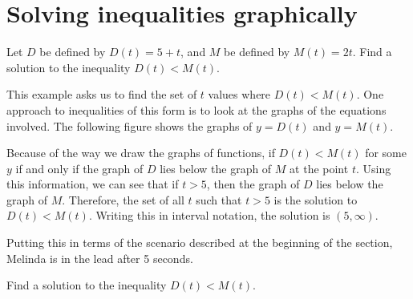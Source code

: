 \documentclass[noauthor, nooutcomes]{ximera}
\begin{document}
\section{Solving inequalities graphically}
\begin{example}
Let $D$ be defined by $D(t) = 5 + t$, and $M$ be defined by $M(t) = 2t$. Find a solution to the inequality $D(t) < M(t)$. 
\end{example}
\begin{explanation}
This example asks us to find the set of $t$ values where $D(t) < M(t)$. One approach to inequalities of this form is to look at the graphs of the equations involved. The following figure shows the graphs of $y = D(t)$ and $y = M(t)$. 

\begin{image}
\end{image}

Because of the way we draw the graphs of functions, if $D(t) < M(t)$ for some $y$ if and only if the graph of $D$ lies below the graph of $M$ at the point $t$. Using this information, we can see that if $t > 5$, then the graph of $D$ lies below the graph of $M$. Therefore, the set of all $t$ such that $t > 5$ is the solution to $D(t) < M(t)$. Writing this in interval notation, the solution is $(5, \infty)$. 

Putting this in terms of the scenario described at the beginning of the section, Melinda is in the lead after 5 seconds. 
\end{explanation}

\begin{exploration}
Find a solution to the inequality $D(t) < M(t)$. 
\end{exploration}
\end{document}
